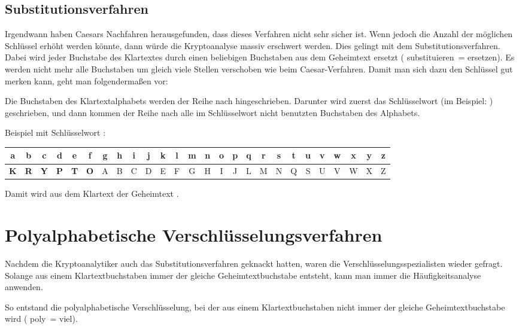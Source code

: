 \subsection{Substitutionsverfahren}

Irgendwann haben Caesars Nachfahren herausgefunden, dass dieses Verfahren nicht
sehr sicher ist. Wenn jedoch die Anzahl der möglichen Schlüssel erhöht werden
könnte, dann würde die Kryptoanalyse massiv erschwert werden. Dies gelingt mit
dem Substitutionsverfahren. Dabei wird jeder Buchstabe des Klartextes durch
einen beliebigen Buchstaben aus dem Geheimtext ersetzt (\glqq
substituieren\grqq\ = \glqq ersetzen\grqq ). Es werden nicht mehr alle
Buchstaben um gleich viele Stellen verschoben wie beim Caesar-Verfahren.
Damit man sich dazu den Schlüssel gut merken kann, geht man folgendermaßen
vor:

Die Buchstaben des Klartextalphabets werden der Reihe nach hingeschrieben.
Darunter wird zuerst das Schlüsselwort (im Beispiel: )
geschrieben, und dann kommen der Reihe nach alle im Schlüsselwort nicht
benutzten Buchstaben des Alphabets.

Beispiel mit Schlüsselwort :	

\bgroup
\def\arraystretch{1.2}
\setlength{\tabcolsep}{.5em}
\begin{tabular}{|c|c|c|c|c|c|c|c|c|c|c|c|c|c|c|c|c|c|c|c|c|c|c|c|c|c|}\hline
a & b & c & d & e & f & g & h & i & j & k & l & m & n & o & p & q & r & s
& t & u & v & w & x & y & z \\ \hline
\textbf{K} & \textbf{R} & \textbf{Y} & \textbf{P} & \textbf{T} & \textbf{O} & A
& B & C & D & E & F & G & H & I & J & L & M & N & Q & S & U & V & W & X & Z \\
\hline
\end{tabular}
\egroup

Damit wird aus dem Klartext  der Geheimtext
.


\section{Polyalphabetische Verschlüsselungsverfahren}

Nachdem die Kryptoanalytiker auch das Substitutionsverfahren geknackt hatten,
waren die Verschlüsselungsspezialisten wieder gefragt. Solange aus einem
Klartextbuchstaben immer der gleiche Geheimtextbuchstabe entsteht, kann man
immer die Häufigkeitsanalyse anwenden.

So entstand die polyalphabetische Verschlüsselung, bei der aus einem
Klartextbuchstaben nicht immer der gleiche Geheimtextbuchstabe wird (\glqq
poly\grqq\ = \glqq viel\grqq ).

